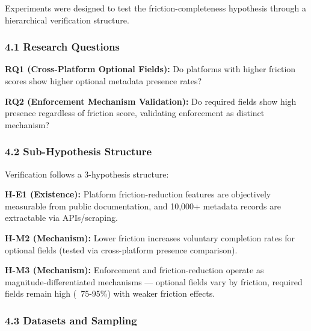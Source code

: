 
Experiments were designed to test the friction-completeness hypothesis through a hierarchical verification structure.

\subsubsection{4.1 Research Questions}

\textbf{RQ1 (Cross-Platform Optional Fields):} Do platforms with higher friction scores show higher optional metadata presence rates?

\textbf{RQ2 (Enforcement Mechanism Validation):} Do required fields show high presence regardless of friction score, validating enforcement as distinct mechanism?

\subsubsection{4.2 Sub-Hypothesis Structure}

Verification follows a 3-hypothesis structure:

\textbf{H-E1 (Existence):} Platform friction-reduction features are objectively measurable from public documentation, and 10,000+ metadata records are extractable via APIs/scraping.

\textbf{H-M2 (Mechanism):} Lower friction increases voluntary completion rates for optional fields (tested via cross-platform presence comparison).

\textbf{H-M3 (Mechanism):} Enforcement and friction-reduction operate as magnitude-differentiated mechanisms --- optional fields vary by friction, required fields remain high (~75-95\%) with weaker friction effects.

\subsubsection{4.3 Datasets and Sampling}

\begin{table}[htbp]
\centering
{}
\end{table}

